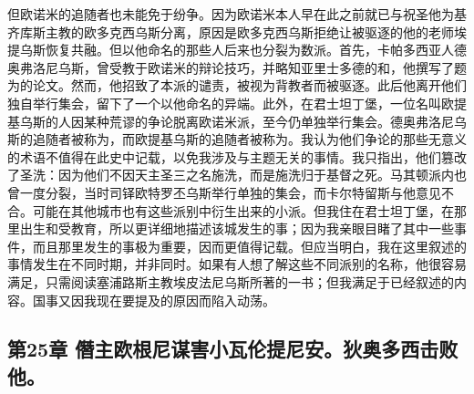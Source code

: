 但欧诺米的追随者也未能免于纷争。因为欧诺米本人早在此之前就已与祝圣他为基齐库斯主教的欧多克西乌斯分离，原因是欧多克西乌斯拒绝让被驱逐的他的老师埃提乌斯恢复共融。但以他命名的那些人后来也分裂为数派。首先，卡帕多西亚人德奥弗洛尼乌斯，曾受教于欧诺米的辩论技巧，并略知亚里士多德的和，他撰写了题为的论文。然而，他招致了本派的谴责，被视为背教者而被驱逐。此后他离开他们独自举行集会，留下了一个以他命名的异端。此外，在君士坦丁堡，一位名叫欧提基乌斯的人因某种荒谬的争论脱离欧诺米派，至今仍单独举行集会。德奥弗洛尼乌斯的追随者被称为，而欧提基乌斯的追随者被称为。我认为他们争论的那些无意义的术语不值得在此史中记载，以免我涉及与主题无关的事情。我只指出，他们篡改了圣洗：因为他们不因天主圣三之名施洗，而是施洗归于基督之死。马其顿派内也曾一度分裂，当时司铎欧特罗丕乌斯举行单独的集会，而卡尔特留斯与他意见不合。可能在其他城市也有这些派别中衍生出来的小派。但我住在君士坦丁堡，在那里出生和受教育，所以更详细地描述该城发生的事；因为我亲眼目睹了其中一些事件，而且那里发生的事极为重要，因而更值得记载。但应当明白，我在这里叙述的事情发生在不同时期，并非同时。如果有人想了解这些不同派别的名称，他很容易满足，只需阅读塞浦路斯主教埃皮法尼乌斯所著的一书；但我满足于已经叙述的内容。国事又因我现在要提及的原因而陷入动荡。\par


\subsection{第25章 僭主欧根尼谋害小瓦伦提尼安。狄奥多西击败他。}


